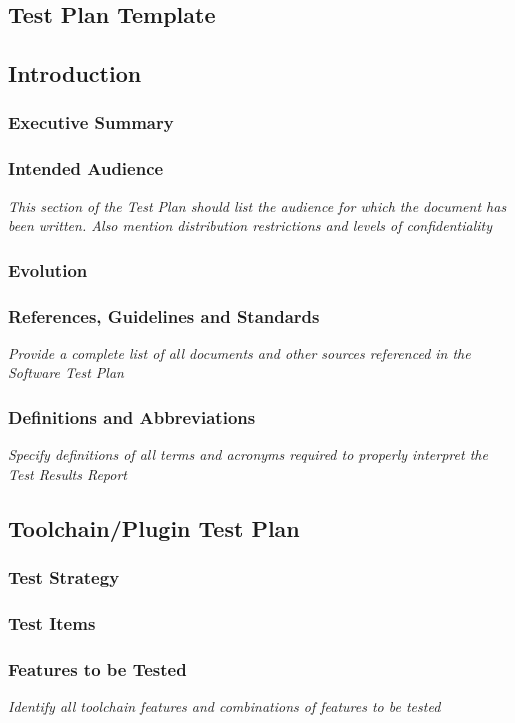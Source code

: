 \newpage
\begin{appendices}
   \addappheadtotoc
   \appendixpage

\section{Test Plan Template}
\label{ref:test_plan_template}

\subsection{Introduction}
\subsubsection{Executive Summary}
\subsubsection{Intended Audience}
\textit{This section of the Test Plan should list the audience for which the document has been written. Also mention distribution restrictions and levels of confidentiality}
\subsubsection{Evolution}
\subsubsection{References, Guidelines and Standards}
\textit{Provide a complete list of all documents and other sources referenced in the Software Test Plan}
\subsubsection{Definitions and Abbreviations}
\textit{Specify definitions of all terms and acronyms required to properly interpret the Test Results Report}

\subsection{Toolchain/Plugin Test Plan}
\subsubsection{Test Strategy}
\subsubsection{Test Items}
\subsubsection{Features to be Tested}
\textit{Identify all toolchain features and combinations of features to be tested}

\end{appendices}
